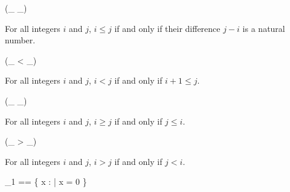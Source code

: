 \documentclass[draft,a4paper,10pt,wd]{isov2}
\begin{document}

\begin{zed}
\relation (\_ \leq \_)
\end{zed}


For all integers $i$ and $j$,  $i \leq j$ if and only if
their difference $j - i$ is a natural number.


\begin{zed}
\relation (\_ < \_)
\end{zed}


For all integers $i$ and $j$,
$i < j$ if and only if $i + 1 \leq j$.


\begin{zed}
\relation (\_ \geq \_)
\end{zed}


For all integers $i$ and $j$,
$i \geq j$ if and only if $j \leq i$.


\begin{zed}
\relation (\_ > \_)
\end{zed}


For all integers $i$ and $j$,
$i > j$ if and only if $j < i$.


\begin{zed}
\nat_1 == \{ x : \nat | \lnot x = 0 \}
\end{zed}
\end{document}
